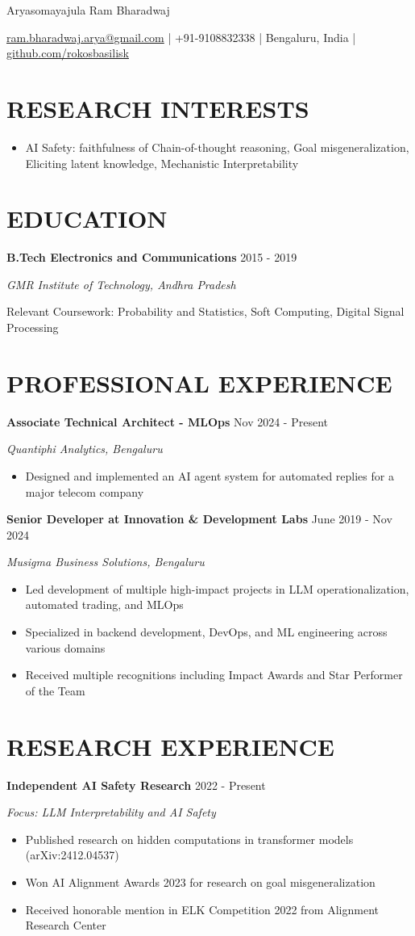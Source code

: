 \documentclass[fontsize=11pt]{article}
\newcommand{\MyName}[1]{
    \Huge \usefont{OT1}{phv}{b}{n} \hfill #1
    \par \normalsize \normalfont}
\newcommand{\NewPart}[1]{\section*{\uppercase{#1}}}
\newcommand{\EducationEntry}[4]{
    \noindent \textbf{#1} \hfill {#2} \par
    \noindent \textit{#3} \par
    \noindent \small #4
    \normalsize \par}
\newcommand{\ResearchEntry}[4]{
    \noindent \textbf{#1} \hfill {#2} \par
    \noindent \textit{#3} \par
    \noindent \small #4
    \normalsize \par}
\begin{document}
\MyName{Aryasomayajula Ram Bharadwaj}
\bigskip

{\small \hfill \href{mailto:ram.bharadwaj.arya@gmail.com}{ram.bharadwaj.arya@gmail.com} | +91-9108832338 | Bengaluru, India | \href{https://github.com/rokosbasilisk}{github.com/rokosbasilisk}}

\NewPart{Research Interests}
\begin{itemize}
\item AI Safety: faithfulness of Chain-of-thought reasoning, Goal misgeneralization, Eliciting latent knowledge, Mechanistic Interpretability
\end{itemize}

\NewPart{Education}
\EducationEntry
{B.Tech Electronics and Communications}
{2015 - 2019}
{GMR Institute of Technology, Andhra Pradesh}
{Relevant Coursework: Probability and Statistics, Soft Computing, Digital Signal Processing}

\NewPart{Professional Experience}
\ResearchEntry
{Associate Technical Architect - MLOps}
{Nov 2024 - Present}
{Quantiphi Analytics, Bengaluru}
{
\begin{itemize}
\item Designed and implemented an AI agent system for automated replies for a major telecom company
\end{itemize}}

\ResearchEntry
{Senior Developer at Innovation \& Development Labs}
{June 2019 - Nov 2024}
{Musigma Business Solutions, Bengaluru}
{
\begin{itemize}
\item Led development of multiple high-impact projects in LLM operationalization, automated trading, and MLOps
\item Specialized in backend development, DevOps, and ML engineering across various domains
\item Received multiple recognitions including Impact Awards and Star Performer of the Team
\end{itemize}}

\NewPart{Research Experience}
\ResearchEntry
{Independent AI Safety Research}
{2022 - Present}
{Focus: LLM Interpretability and AI Safety}
{
\begin{itemize}
\item Published research on hidden computations in transformer models (arXiv:2412.04537)
\item Won AI Alignment Awards 2023 for research on goal misgeneralization
\item Received honorable mention in ELK Competition 2022 from Alignment Research Center
\end{itemize}}
\end{document}

